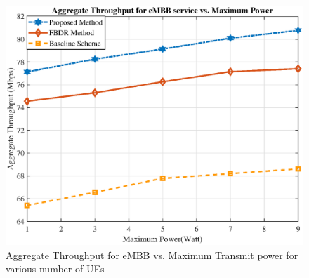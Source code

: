 \documentclass[conference]{IEEEtran}
\begin{document}
\begin{figure}
  \centering 
    \includegraphics[scale = 0.47]{RatePower1.eps}
  \caption{Aggregate Throughput for eMBB vs. Maximum Transmit power for various number of UEs }
  \label{fig:5}
\end{figure}
\end{document}
